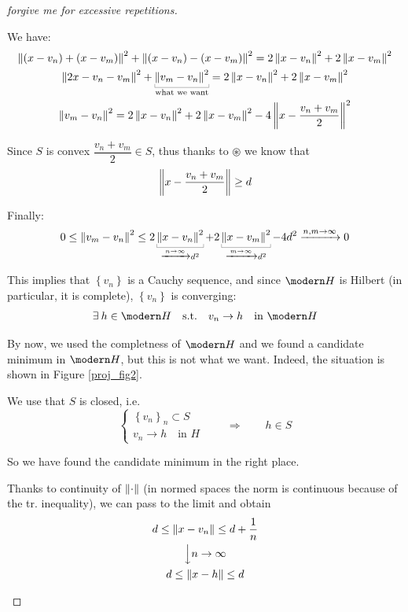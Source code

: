 \begin{proof}[forgive me for excessive repetitions]
\begin{enumerate}[(a)]
We have:
\begin{gather*}
\norm{(x-v_n)+(x-v_m)}^2+\norm{(x-v_n)-(x-v_m)}^2=2\norm{x-v_n}^2+2\norm{x-v_m}^2 \\ 
\norm{2x-v_n-v_m}^2+\underbracket[0.2pt]{\norm{v_m-v_n}^2}_{\text{what we want}}=2\norm{x-v_n}^2+2\norm{x-v_m}^2 \\ 
\norm{v_m-v_n}^2=2\norm{x-v_n}^2+2\norm{x-v_m}^2 -4\norm{x- \frac{v_n+v_m}{2} }^2
\end{gather*}

Since $S$ is convex $\dfrac{v_n+v_m}{2}\in S$, thus thanks to $\circledast$ we know that
\begin{equation*}
\left\lVert x- \frac{v_n+v_m}{2}  \right\rVert \geq d
\end{equation*}

Finally:
\begin{equation*}
0\leq \norm{v_m-v_n}^2 \leq 2\underbracket[0.2pt]{\norm{x-v_n}^2}_{\xrightarrow[]{n\to\infty} d^2}+2\underbracket[0.2pt]{\norm{x-v_m}^2}_{\xrightarrow[]{m\to\infty} d^2} -4d^2 \xrightarrow[]{n,m\to\infty} 0
\end{equation*}

This implies that $\left\{ v_n \right\}$ is a Cauchy sequence, and since $\Hc$ is Hilbert (in particular, it is complete), $\left\{ v_n \right\}$ is converging:
\begin{equation*}
    \exists h\in \Hc\quad\text{s.t.}\quad v_n\to h\quad\text{in }\Hc
\end{equation*}

By now, we used the completness of $\Hc$ and we found a candidate minimum in $\Hc$, but this is not what we want. Indeed, the situation is shown in Figure \ref{proj_fig2}.

We use that $S$ is closed, i.e.
\begin{equation*}
    \begin{cases}
        \left\{ v_n \right\}_n\subset S \\
        v_n\to h\quad\text{in }H
    \end{cases}
    \qquad\Longrightarrow\qquad h\in S
\end{equation*}

So we have found the candidate minimum in the right place.

Thanks to continuity of $\left\lVert \cdot \right\rVert$ (in normed spaces the norm is continuous because of the tr. inequality), we can pass to the limit and obtain
\begin{gather*}
d\leq \left\lVert x-v_n \right\rVert\leq d+\frac{1}{n} \\
\Big\downarrow n\to\infty \\
d\leq \left\lVert x-h \right\rVert\leq d
\end{gather*}


\end{enumerate}
\end{proof}
